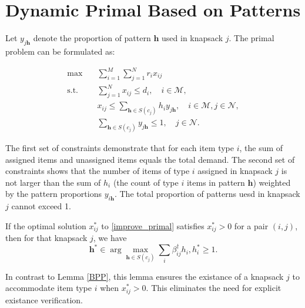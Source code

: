 \section{Dynamic Primal Based on Patterns}

Let $y_{j \bm{h}}$ denote the proportion of pattern $\bm{h}$ used in knapsack $j$. The primal problem can be formulated as:

\begin{equation}\label{improve_primal}
    \begin{aligned}
    \max \quad & \sum_{i=1}^M \sum_{j=1}^N r_i x_{i j} \\
    \text {s.t.} \quad & \sum_{j=1}^N x_{i j} \leq d_i, \quad i \in \mathcal{M}, \\
    & x_{i j} \leq \sum_{\bm{h} \in S(c_{j})} h_i y_{j \bm{h}}, \quad i \in \mathcal{M}, j \in \mathcal{N}, \\
    & \sum_{\bm{h} \in S(c_{j})} y_{j \bm{h}} \leq 1, \quad j \in \mathcal{N}.
    \end{aligned}
\end{equation}

The first set of constraints demonstrate that for each item type $i$, the sum of assigned items and unassigned items equals the total demand. The second set of constraints shows that the number of items of type $i$ assigned in knapsack $j$ is not larger than the sum of $h_{i}$ (the count of type $i$ items in pattern $\bm{h}$) weighted by the pattern proportions $y_{i \bm{h}}$. The total proportion of patterns uesd in knapsack $j$ cannot exceed 1.

\begin{prop}\label{primal}
If the optimal solution $x_{ij}^{*}$ to \eqref{improve_primal} satisfies $x_{ij}^{*} > 0$ for a pair $(i,j)$, then for that knapsack $j$, we have $$\bm{h}^{*} \in \arg\max_{\bm{h} \in S(c_j)} \sum_{i} \beta_{ij}^{\dag} h_{i}, h_{i}^{*} \geq 1.$$
\end{prop}

In contrast to Lemma \ref{BPP}, this lemma ensures the existance of a knapsack $j$ to accommodate item type $i$ when $x_{ij}^{*} > 0$. This eliminates the need for explicit existance verification.




